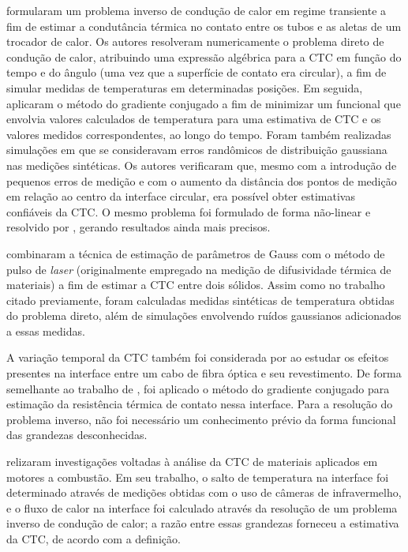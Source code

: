 \cite{artigo_huang} formularam um problema inverso de condução de calor em regime transiente a fim de estimar a condutância térmica no contato entre
os tubos e as aletas de um trocador de calor. Os autores resolveram numericamente o problema direto de condução de calor, atribuindo uma expressão
algébrica para a CTC em função do tempo e do ângulo (uma vez que a superfície de contato era circular), a fim de simular medidas de temperaturas
em determinadas posições. Em seguida, aplicaram o método do gradiente conjugado a fim de minimizar um funcional que envolvia valores calculados
de temperatura para uma estimativa de CTC e os valores medidos correspondentes, ao longo do tempo. Foram também realizadas simulações em que se
consideravam erros randômicos de distribuição gaussiana nas medições sintéticas. Os autores verificaram que, mesmo com a introdução de pequenos erros de medição e com
o aumento da distância dos pontos de medição em relação ao centro da interface circular, era possível obter estimativas confiáveis da CTC. O mesmo
problema foi formulado de forma não-linear e resolvido por \cite{artigo_huang_2}, gerando resultados ainda mais precisos.

\cite{artigo_milosevic} combinaram a técnica de estimação de parâmetros de Gauss com o método de pulso de \textit{laser} (originalmente empregado
na medição de difusividade térmica de materiais) a fim de estimar a CTC entre dois sólidos. Assim como no trabalho citado previamente, foram calculadas
medidas sintéticas de temperatura obtidas do problema direto, além de simulações envolvendo ruídos gaussianos adicionados a essas medidas.

A variação temporal da CTC também foi considerada por \cite{artigo_yang} ao estudar os efeitos presentes na interface entre um cabo de
fibra óptica e seu revestimento. De forma semelhante ao trabalho de \cite{artigo_huang}, foi aplicado o método do gradiente conjugado para estimação
da resistência térmica de contato nessa interface. Para a resolução do problema inverso, não foi necessário um conhecimento prévio da forma funcional das grandezas desconhecidas.

\cite{artigo_fieberg} relizaram investigações voltadas à análise da CTC de materiais aplicados em motores a combustão. Em seu trabalho, o salto de temperatura
na interface foi determinado através de medições obtidas com o uso de câmeras de infravermelho, e o fluxo de calor na interface foi calculado
através da resolução de um problema inverso de condução de calor; a razão entre essas grandezas forneceu a estimativa da CTC, de acordo
com a definição.   

